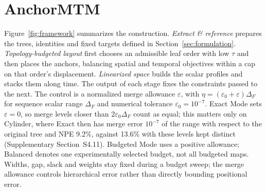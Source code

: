 \begin{figure}[!tb]
\end{figure}
\section{AnchorMTM}\label{sec:method}\label{sec:construction}

Figure~\ref{fig:framework} summarizes the construction. \emph{Extract \& reference} prepares the trees, identities and fixed targets defined in Section~\ref{sec:formulation}. \emph{Topology-budgeted layout} first chooses an admissible leaf order with low $\tau$ and then places the anchors, balancing spatial and temporal objectives within a cap on that order's displacement. \emph{Linearized space} builds the scalar profiles and stacks them along time. The output of each stage fixes the constraints passed to the next. The control is a normalized merge allowance $\varepsilon$, with $\eta=(\varepsilon_0+\varepsilon)\Delta_F$ for sequence scalar range $\Delta_F$ and numerical tolerance $\varepsilon_0=10^{-7}$. Exact Mode sets $\varepsilon=0$, so merge levels closer than $2\varepsilon_0\Delta_F$ count as equal; this matters only on Cylinder, where Exact then has merge error $10^{-7}$ of the range with respect to the original tree and NPE 9.2\%, against 13.6\% with these levels kept distinct (Supplementary Section~S4.11). Budgeted Mode uses a positive allowance; Balanced denotes one experimentally selected budget, not all budgeted maps. Widths, gap, slack and weights stay fixed during a budget sweep; the merge allowance controls hierarchical error rather than directly bounding positional error.

